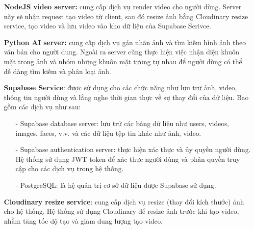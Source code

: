 \textbf{NodeJS video server:} cung cấp dịch vụ render video cho người dùng. Server này sẽ nhận request tạo video từ client, sau đó resize ảnh bằng Cloudinary resize service, tạo video và lưu video vào kho dữ liệu của Supabase Serivce. 

\textbf{Python AI server:} cung cấp dịch vụ gán nhãn ảnh và tìm kiếm hình ảnh theo văn bản cho người dung. Ngoài ra server cũng thực hiện việc nhận diện khuôn mặt trong ảnh và nhóm những khuôn mặt tương tự nhau để người dùng có thể dễ dàng tìm kiếm và phân loại ảnh. 

\textbf{Supabase Service}: được sử dụng cho các chức năng như lưu trữ ảnh, video, thông tin người dùng và lắng nghe thời gian thực về sự thay đổi của dữ liệu. Bao gồm các dịch vụ như sau:
\begin{itemize}
    \item[-] Supabase database server: lưu trữ các bảng dữ liệu như users, videos, images, faces, v.v. và các dữ liệu tệp tin khác như ảnh, video.
    \item[-] Supabase authentication server: thực hiện xác thực và ủy quyền người dùng. Hệ thống sử dụng JWT token để xác thực người dùng và phân quyền truy cập cho các dịch vụ trong hệ thống.
    \item[-] PostgreSQL: là hệ quản trị cơ sở dữ liệu được Supabase sử dụng.  
\end{itemize}

\textbf{Cloudinary resize service}: cung cấp dịch vụ resize (thay đổi kích thước) ảnh cho hệ thống. Hệ thống sử dụng Cloudinary để resize ảnh trước khi tạo video, nhằm tăng tốc độ tạo và giảm dung lượng tạo video.
